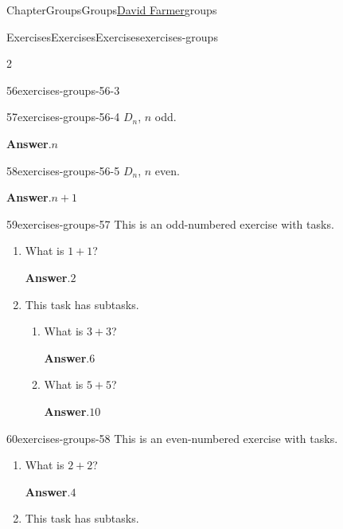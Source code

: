 \documentclass[oneside,10pt,]{book}
\newcommand{\blocktitlefont}{\relax}
\numberwithin{equation}{section}
\begin{document}
\begin{chapterptx}{Chapter}{Groups}{}{Groups}{\hyperlink{dfarmer}{David Farmer}}{}{groups}
\begin{exercises-section}{Exercises}{Exercises}{}{Exercises}{}{}{exercises-groups}
\begin{exercisegroupcol}{2}
\begin{divisionexerciseegcol}{56}{}{}{exercises-groups-56-3}
\end{divisionexerciseegcol}%
\begin{divisionexerciseegcol}{57}{}{}{exercises-groups-56-4}%
\(D_n\), \(n\) odd.%
\par\smallskip%
\noindent\textbf{\blocktitlefont Answer}.\hypertarget{exercises-groups-56-4-2}{}\quad{}\(n\)%
\end{divisionexerciseegcol}%
\begin{divisionexerciseegcol}{58}{}{}{exercises-groups-56-5}%
\(D_n\), \(n\) even.%
\par\smallskip%
\noindent\textbf{\blocktitlefont Answer}.\hypertarget{exercises-groups-56-5-2}{}\quad{}\(n+1\)%
\end{divisionexerciseegcol}%
\end{exercisegroupcol}
\par\medskip\noindent
\begin{divisionexercise}{59}{}{}{exercises-groups-57}%
This is an odd-numbered exercise with tasks.%
\begin{enumerate}[font=\bfseries,label=(\alph*),ref=\alph*]%
\item{}What is \(1+1\)?%
\par\smallskip%
\noindent\textbf{\blocktitlefont Answer}.\hypertarget{exercises-groups-57-2-2}{}\quad{}\(2\)%
\item{}This task has subtasks.%
\begin{enumerate}[font=\bfseries,label=(\roman*),ref=\theenumi.\roman*]%
\item{}What is \(3+3\)?%
\par\smallskip%
\noindent\textbf{\blocktitlefont Answer}.\hypertarget{exercises-groups-57-3-2-2}{}\quad{}\(6\)%
\item{}What is \(5+5\)?%
\par\smallskip%
\noindent\textbf{\blocktitlefont Answer}.\hypertarget{exercises-groups-57-3-3-2}{}\quad{}\(10\)%
\end{enumerate}%
\end{enumerate}%
\end{divisionexercise}%
\begin{divisionexercise}{60}{}{}{exercises-groups-58}%
This is an even-numbered exercise with tasks.%
\begin{enumerate}[font=\bfseries,label=(\alph*),ref=\alph*]%
\item{}What is \(2+2\)?%
\par\smallskip%
\noindent\textbf{\blocktitlefont Answer}.\hypertarget{exercises-groups-58-2-2}{}\quad{}\(4\)%
\item{}This task has subtasks.%

\end{enumerate}
\end{divisionexercise}
\end{exercises-section}
\end{chapterptx}
\end{document}
